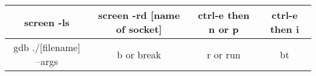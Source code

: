 \documentclass{article}
\begin{document}
\begin{tabular}{|c|c|c|c|}

\hline
screen -ls & screen -rd [name of socket] & ctrl-e then n or p & ctrl-e then i  \\
\hline
gdb ./[filename] --args & b or break & r or run & bt   



\end{tabular}
\end{document}
